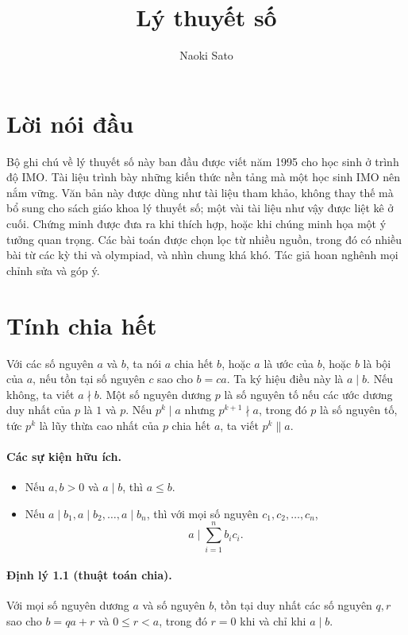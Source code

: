 \documentclass[11pt]{article}
\title{Lý thuyết số}
\author{Naoki Sato}
\date{}
\begin{document}
\maketitle

\section*{Lời nói đầu}

Bộ ghi chú về lý thuyết số này ban đầu được viết năm 1995 cho học sinh ở
trình độ IMO. Tài liệu trình bày những kiến thức nền tảng mà một học sinh IMO
nên nắm vững. Văn bản này được dùng như tài liệu tham khảo, không thay thế mà
bổ sung cho sách giáo khoa lý thuyết số; một vài tài liệu như vậy được liệt
kê ở cuối. Chứng minh được đưa ra khi thích hợp, hoặc khi chúng minh họa một
ý tưởng quan trọng. Các bài toán được chọn lọc từ nhiều nguồn, trong đó có
nhiều bài từ các kỳ thi và olympiad, và nhìn chung khá khó. Tác giả hoan nghênh
mọi chỉnh sửa và góp ý.

\section{Tính chia hết}

Với các số nguyên \(a\) và \(b\), ta nói \(a\) chia hết \(b\), hoặc \(a\) là
ước của \(b\), hoặc \(b\) là bội của \(a\), nếu tồn tại số nguyên \(c\) sao
cho \(b=ca\). Ta ký hiệu điều này là \(a\mid b\). Nếu không, ta viết
\(a\nmid b\). Một số nguyên dương \(p\) là số nguyên tố nếu các ước dương duy
nhất của \(p\) là \(1\) và \(p\). Nếu \(p^k\mid a\) nhưng \(p^{k+1}\nmid a\),
trong đó \(p\) là số nguyên tố, tức \(p^k\) là lũy thừa cao nhất của \(p\)
chia hết \(a\), ta viết \(p^k\|a\).

\paragraph{Các sự kiện hữu ích.}
\begin{itemize}
\item Nếu \(a,b>0\) và \(a\mid b\), thì \(a\le b\).
\item Nếu \(a\mid b_1,a\mid b_2,\ldots,a\mid b_n\), thì với mọi số nguyên
\(c_1,c_2,\ldots,c_n\),
\[
  a\mid \sum_{i=1}^n b_i c_i.
\]
\end{itemize}

\paragraph{Định lý 1.1 (thuật toán chia).}
Với mọi số nguyên dương \(a\) và số nguyên \(b\), tồn tại duy nhất các số
nguyên \(q,r\) sao cho \(b=qa+r\) và \(0\le r<a\), trong đó \(r=0\) khi và chỉ
khi \(a\mid b\).
\end{document}
